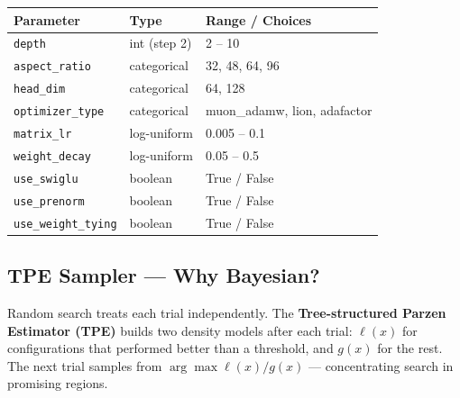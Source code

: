 \documentclass[12pt, a4paper]{article}
\newcommand{\code}[1]{\texttt{#1}}
\begin{document}
\begin{center}
\begin{tabular}{@{}lll@{}}
\toprule
\textbf{Parameter} & \textbf{Type} & \textbf{Range / Choices} \\
\midrule
\code{depth}          & int (step 2)  & 2 -- 10 \\
\code{aspect\_ratio}  & categorical   & 32, 48, 64, 96 \\
\code{head\_dim}      & categorical   & 64, 128 \\
\code{optimizer\_type}& categorical   & muon\_adamw, lion, adafactor \\
\code{matrix\_lr}     & log-uniform   & 0.005 -- 0.1 \\
\code{weight\_decay}  & log-uniform   & 0.05 -- 0.5 \\
\code{use\_swiglu}    & boolean       & True / False \\
\code{use\_prenorm}   & boolean       & True / False \\
\code{use\_weight\_tying} & boolean   & True / False \\
\bottomrule
\end{tabular}
\end{center}

\subsection{TPE Sampler — Why Bayesian?}

Random search treats each trial independently. The \textbf{Tree-structured Parzen Estimator
(TPE)} builds two density models after each trial:
$\ell(x)$ for configurations that performed better than a threshold, and $g(x)$ for the rest.
The next trial samples from $\arg\max \ell(x)/g(x)$ — concentrating search in promising
regions.
\end{document}

